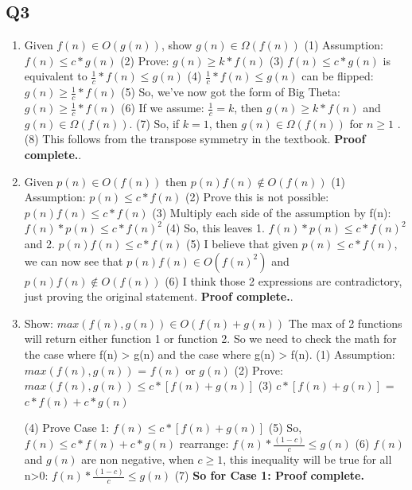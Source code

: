 \documentclass{article}
\begin{document}
\subsection*{Q3}
\begin{enumerate}[label=(\alph*)]
    \item Given $f(n) \in O(g(n))$, show $g(n) \in \Omega(f(n))$
    \subitem (1) Assumption: $f(n) \leq c*g(n)$
    \subitem (2) Prove: $g(n) \geq k*f(n)$
    \subitem (3) $f(n) \leq c*g(n)$ is equivalent to $\frac{1}{c} * f(n) \leq g(n)$
    \subitem (4) $\frac{1}{c} * f(n) \leq g(n)$ can be flipped: $g(n) \geq \frac{1}{c} * f(n)$
    \subitem (5) So, we've now got the form of Big Theta: $g(n) \geq \frac{1}{c} * f(n)$
    \subitem (6) If we assume: $\frac{1}{c} = k$, then $g(n) \geq k * f(n)$ and $g(n) \in \Omega(f(n))$.
    \subitem (7) So, if $k = 1$, then $g(n) \in \Omega(f(n))$ for $n \geq 1$ .
    \subitem (8) This follows from the transpose symmetry in the textbook. \textbf{Proof complete.}.
    
    \item Given $p(n) \in O(f(n))$ then $p(n)f(n) \not\in O(f(n))$
    \subitem (1) Assumption: $p(n) \leq c*f(n)$
    \subitem (2) Prove this is not possible: $p(n)f(n) \leq c * f(n)$
    \subitem (3) Multiply each side of the assumption by f(n): $f(n) * p(n) \leq c * f(n)^2$ 
    \subitem (4) So, this leaves 1. $f(n) * p(n) \leq c * f(n)^2$ and 2. $p(n)f(n) \leq c * f(n)$
    \subitem (5) I believe that given $p(n) \leq c*f(n)$, we can now see that $p(n)f(n) \in O(f(n)^2)$ and $p(n)f(n) \not\in O(f(n))$
    \subitem (6) I think those 2 expressions are contradictory, just proving the original statement. \textbf{Proof complete.}.

    \item Show: $max(f(n), g(n)) \in O(f(n)+g(n))$
    \subitem The max of 2 functions will return either function 1 or function 2. So we need to check the math for the case where f(n) > g(n) and the case where g(n) > f(n).
    \subitem (1) Assumption: $max(f(n), g(n))$ = $f(n)$ or $g(n)$
    \subitem (2) Prove: $max(f(n), g(n)) \leq c * [f(n)+g(n)]$
    \subitem (3) $c * [f(n)+g(n)]$  = $c*f(n)+c*g(n)$
 
    \subitem (4) Prove Case 1: $f(n) \leq c * [f(n)+g(n)]$
    \subitem (5) So, $f(n) \leq c*f(n)+c*g(n)$ rearrange: $f(n) * \frac{(1-c)}{c} \leq g(n)$
    \subitem (6) $f(n)$ and $g(n)$ are non negative, when $c \geq 1$, this inequality will be true for all n>0: $f(n) * \frac{(1-c)}{c} \leq g(n)$
    \subitem (7) \textbf{So for Case 1: Proof complete.} 


\end{enumerate}
\end{document}
